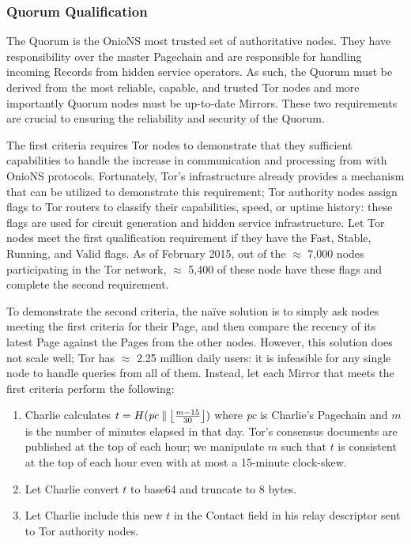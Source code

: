 \subsubsection{Quorum Qualification}

The Quorum is the OnioNS most trusted set of authoritative nodes. They have responsibility over the master Pagechain and are responsible for handling incoming Records from hidden service operators. As such, the Quorum must be derived from the most reliable, capable, and trusted Tor nodes and more importantly Quorum nodes must be up-to-date Mirrors. These two requirements are crucial to ensuring the reliability and security of the Quorum.

The first criteria requires Tor nodes to demonstrate that they sufficient capabilities to handle the increase in communication and processing from with OnioNS protocols. Fortunately, Tor's infrastructure already provides a mechanism that can be utilized to demonstrate this requirement; Tor authority nodes assign flags to Tor routers to classify their capabilities, speed, or uptime history: these flags are used for circuit generation and hidden service infrastructure. Let Tor nodes meet the first qualification requirement if they have the Fast, Stable, Running, and Valid flags. As of February 2015, out of the $ \approx $ 7,000 nodes participating in the Tor network, $ \approx $ 5,400 of these node have these flags and complete the second requirement\cite{TorMetrics}.

To demonstrate the second criteria, the na\"{i}ve solution is to simply ask nodes meeting the first criteria for their Page, and then compare the recency of its latest Page against the Pages from the other nodes. However, this solution does not scale well; Tor has $ \approx $ 2.25 million daily users\cite{TorMetrics}: it is infeasible for any single node to handle queries from all of them. Instead, let each Mirror that meets the first criteria perform the following:

\begin{enumerate}
	\item Charlie calculates $ t = H(\mathit{pc} \concat \floor[\big]{\frac{m - 15}{30}}) $ where \emph{pc} is Charlie's Pagechain and $ m $ is the number of minutes elapsed in that day. Tor's consensus documents are published at the top of each hour; we manipulate $ m $ such that $ t $ is consistent at the top of each hour even with at most a 15-minute clock-skew.
	\item Let Charlie convert $ t $ to base64 and truncate to 8 bytes.
	\item Let Charlie include this new $ t $ in the Contact field in his relay descriptor sent to Tor authority nodes.
\end{enumerate}

